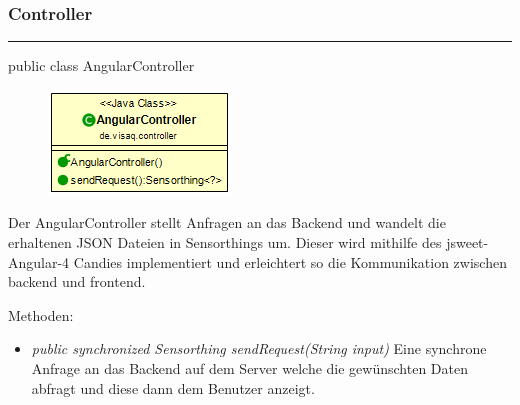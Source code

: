 \subsubsection{Controller}

\rule{\textwidth}{0.4pt}
public class AngularController

\begin{minipage}{0.4\textwidth}
    \begin{figure}[H]
        {\centering\includegraphics[scale = 0.7]{media/frontend/controller/AngularController_Class.png}}
    \end{figure}
    \end{minipage} \hfill
    \begin{minipage}{0.6\textwidth}
Der AngularController stellt Anfragen an das Backend und wandelt die erhaltenen JSON Dateien in Sensorthings um. Dieser wird mithilfe des jsweet-Angular-4 Candies implementiert und erleichtert so die Kommunikation zwischen backend und frontend.
\end{minipage}
Methoden: \begin{itemize}
    \item \emph{public synchronized Sensorthing sendRequest(String input)} Eine synchrone Anfrage an das Backend auf dem Server welche die gewünschten Daten abfragt und diese dann dem Benutzer anzeigt.
\end{itemize}